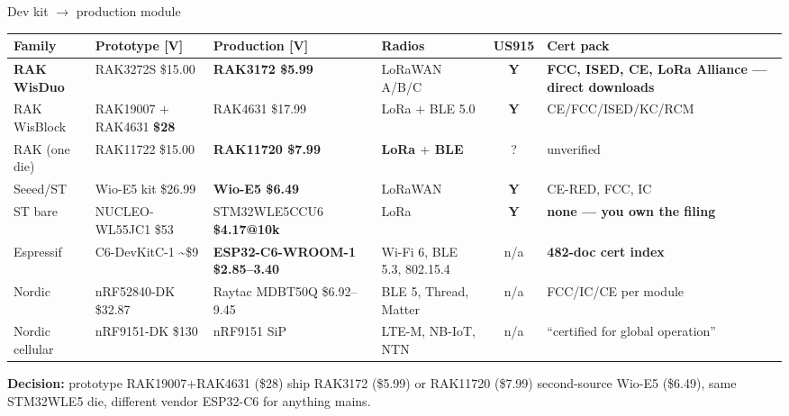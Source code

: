 \documentclass[aspectratio=169,t,10pt,xcolor={table,svgnames}]{beamer}
\newcommand{\yes}{\textbf{Y}}
\newcommand{\hd}[1]{\textbf{\footnotesize #1}}
\begin{document}
\begin{frame}{Dev kit $\rightarrow$ production module}
  \scriptsize
  \begin{tabular}{@{}p{}p{}p{}p{}cp{}@{}}
    \toprule
    \hd{Family} & \hd{Prototype [V]} & \hd{Production [V]} & \hd{Radios} & \hd{US915} & \hd{Cert pack} \\
    \midrule
    \rowcolor{fill1}
    \textbf{RAK WisDuo} & RAK3272S \$15.00 & \textbf{RAK3172 \$5.99} & LoRaWAN A/B/C & \yes & \textbf{FCC, ISED, CE, LoRa Alliance --- direct downloads} \\
    RAK WisBlock & RAK19007 $+$ RAK4631 \textbf{\$28} & RAK4631 \$17.99 & LoRa $+$ BLE 5.0 & \yes & CE/FCC/ISED/KC/RCM \\
    RAK (one die) & RAK11722 \$15.00 & \textbf{RAK11720 \$7.99} & \textbf{LoRa $+$ BLE} & ? & unverified \\
    \rowcolor{fill1}
    Seeed/ST & Wio-E5 kit \$26.99 & \textbf{Wio-E5 \$6.49} & LoRaWAN & \yes & CE-RED, FCC, IC \\
    ST bare & NUCLEO-WL55JC1 \$53 & STM32WLE5CCU6 \textbf{\$4.17@10k} & LoRa & \yes & \cellcolor{fill2}\textbf{none --- you own the filing} \\
    \rowcolor{fill1}
    Espressif & C6-DevKitC-1 \textasciitilde\$9 & \textbf{ESP32-C6-WROOM-1 \$2.85--3.40} & Wi-Fi 6, BLE 5.3, 802.15.4 & n/a & \textbf{482-doc cert index} \\
    Nordic & nRF52840-DK \$32.87 & Raytac MDBT50Q \$6.92--9.45 & BLE 5, Thread, Matter & n/a & FCC/IC/CE per module \\
    Nordic cellular & nRF9151-DK \$130 & nRF9151 SiP & LTE-M, NB-IoT, NTN & n/a & ``certified for global operation'' \\
    \bottomrule
  \end{tabular}
  \vspace{0.6em}
  {\footnotesize \textbf{Decision:} prototype RAK19007$+$RAK4631 (\$28) \textperiodcentered{} ship
   RAK3172 (\$5.99) or RAK11720 (\$7.99) \textperiodcentered{} second-source Wio-E5 (\$6.49), same
   STM32WLE5 die, different vendor \textperiodcentered{} ESP32-C6 for anything mains.\par}
\end{frame}
\end{document}
